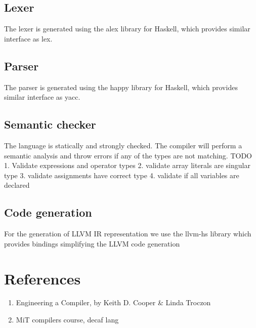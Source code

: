 \documentclass{article}
\begin{document}
\subsection{Lexer}
The lexer is generated using the alex library for Haskell, which provides similar interface as lex. 

\subsection{Parser}
The parser is generated using the happy library for Haskell, which provides similar interface as yacc. 


\subsection{Semantic checker}
The language is statically and strongly checked. The compiler will perform a semantic analysis and throw errors if any of the types are not matching. 
TODO
1. Validate expressions and operator types
2. validate array literals are singular type
3. validate assignments have correct type
4. validate if all variables are declared



\subsection{Code generation}
For the generation of LLVM IR representation we use the llvm-hs library which provides bindings simplifying the LLVM code generation





\section{References}
\begin{enumerate}
    \item  Engineering a Compiler, by Keith D. Cooper & Linda Troczon
    \item MiT compilers course, decaf lang
\end{enumerate}
\end{document}
